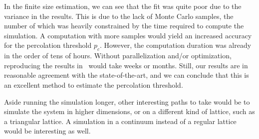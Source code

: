 In the finite size estimation, we can see that the fit was quite poor due to the variance in the results. This is due to the lack of Monte Carlo samples, the number of which was heavily constrained by the time required to compute the simulation. A computation with more samples would yield an increased accuracy for the percolation threshold $p_c$. However, the computation duration was already in the order of tens of hours. Without parallelization and/or optimization, reproducing the results in~\cite{Newman_2001} would take weeks or months. Still, our results are in reasonable agreement with the state-of-the-art, and we can conclude that this is an excellent method to estimate the percolation threshold. 

Aside running the simulation longer, other interesting paths to take would be to simulate the system in higher dimensions, or on a different kind of lattice, such as a triangular lattice. A simulation in a continuum instead of a regular lattice would be interesting as well.










